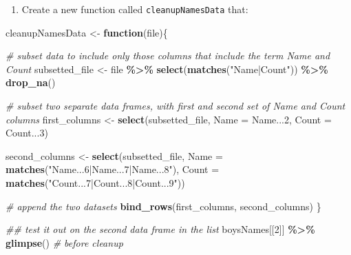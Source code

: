 \documentclass[
]{book}
\newenvironment{Shaded}{\begin{snugshade}}{\end{snugshade}}
\newcommand{\CommentTok}[1]{\textcolor[rgb]{0.56,0.35,0.01}{\textit{#1}}}
\newcommand{\ControlFlowTok}[1]{\textcolor[rgb]{0.13,0.29,0.53}{\textbf{#1}}}
\newcommand{\DataTypeTok}[1]{\textcolor[rgb]{0.13,0.29,0.53}{#1}}
\newcommand{\DecValTok}[1]{\textcolor[rgb]{0.00,0.00,0.81}{#1}}
\newcommand{\KeywordTok}[1]{\textcolor[rgb]{0.13,0.29,0.53}{\textbf{#1}}}
\newcommand{\NormalTok}[1]{#1}
\newcommand{\OperatorTok}[1]{\textcolor[rgb]{0.81,0.36,0.00}{\textbf{#1}}}
\newcommand{\StringTok}[1]{\textcolor[rgb]{0.31,0.60,0.02}{#1}}
\providecommand{\tightlist}{%
  \setlength{\itemsep}{0pt}\setlength{\parskip}{0pt}}
\begin{document}
\begin{alert}

\begin{enumerate}
\def\labelenumi{\arabic{enumi}.}
\tightlist
\item
  Create a new function called \texttt{cleanupNamesData} that:
\end{enumerate}

\begin{Shaded}
\begin{Highlighting}[]
\NormalTok{cleanupNamesData \textless{}{-}}\StringTok{ }\ControlFlowTok{function}\NormalTok{(file)\{}

  \CommentTok{\# subset data to include only those columns that include the term \textasciigrave{}Name\textasciigrave{} and \textasciigrave{}Count\textasciigrave{}}
\NormalTok{  subsetted\_file \textless{}{-}}\StringTok{ }\NormalTok{file }\OperatorTok{\%\textgreater{}\%}
\StringTok{    }\KeywordTok{select}\NormalTok{(}\KeywordTok{matches}\NormalTok{(}\StringTok{"Name|Count"}\NormalTok{)) }\OperatorTok{\%\textgreater{}\%}
\StringTok{    }\KeywordTok{drop\_na}\NormalTok{()}

  \CommentTok{\# subset two separate data frames, with first and second set of \textasciigrave{}Name\textasciigrave{} and \textasciigrave{}Count\textasciigrave{} columns }
\NormalTok{  first\_columns \textless{}{-}}\StringTok{ }\KeywordTok{select}\NormalTok{(subsetted\_file, }\DataTypeTok{Name =}\NormalTok{ Name...}\DecValTok{2}\NormalTok{, }\DataTypeTok{Count =}\NormalTok{ Count...}\DecValTok{3}\NormalTok{) }

\NormalTok{  second\_columns \textless{}{-}}\StringTok{ }\KeywordTok{select}\NormalTok{(subsetted\_file, }\DataTypeTok{Name =} \KeywordTok{matches}\NormalTok{(}\StringTok{"Name...6|Name...7|Name...8"}\NormalTok{),}
                                           \DataTypeTok{Count =} \KeywordTok{matches}\NormalTok{(}\StringTok{"Count...7|Count...8|Count...9"}\NormalTok{))}

  \CommentTok{\# append the two datasets}
  \KeywordTok{bind\_rows}\NormalTok{(first\_columns, second\_columns)}
\NormalTok{\}}


\CommentTok{\#\# test it out on the second data frame in the list}
\NormalTok{boysNames[[}\DecValTok{2}\NormalTok{]] }\OperatorTok{\%\textgreater{}\%}\StringTok{ }\KeywordTok{glimpse}\NormalTok{() }\CommentTok{\# before cleanup}
\end{Highlighting}
\end{Shaded}


\end{alert}
\end{document}
